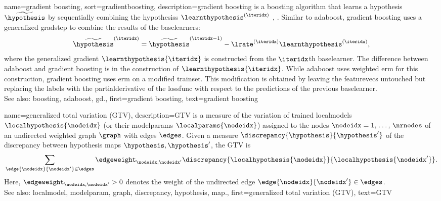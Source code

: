 {name={gradient boosting},
sort={gradientboosting},
 	description={\Gls{gradient} \gls{boosting} is a \gls{boosting} 
 		\gls{algorithm} that learns a \gls{hypothesis} $\widetilde{\hypothesis}$ 
 		by sequentially combining the \glspl{hypothesis} $\learnthypothesis^{(\iteridx)}$ 
 		\cite[Algorithm 10.3]{hastie01statisticallearning}, \cite{Friedman2001}. 
 		Similar to \gls{adaboost}, \gls{gradient} \gls{boosting} uses a generalized \gls{gradstep} 
 		to combine the results of the \glspl{baselearner}:
        		$$\widetilde{\hypothesis}^{(\iteridx)} = \widetilde{\hypothesis}^{(\iteridx-1)}-\lrate^{(\iteridx)} 
 		\learnthypothesis^{(\iteridx)},$$
 		where the generalized \gls{gradient} $\learnthypothesis{\iteridx}$ is constructed from 
		the $\iteridx$th \gls{baselearner}.
 		The difference between \gls{adaboost} and \gls{gradient} \gls{boosting} is in the construction 
		of $\learnthypothesis{\iteridx}$. While \gls{adaboost} uses weighted \gls{erm} for this construction, 
		\gls{gradient} \gls{boosting} uses \gls{erm} on a modified \gls{trainset}. This modification is obtained 
		by leaving the \glspl{featurevec} untouched but replacing the \glspl{label} with the 
		\gls{partialderivative} of the \gls{lossfunc} with respect to the \glspl{prediction} 
		of the previous \gls{baselearner}.   
 		 \\
 		See also: \gls{boosting}, \gls{adaboost}, \gls{gd}.},
 	first={gradient boosting}, 
 	text={gradient boosting}
}
	
{name={generalized total variation (GTV)}, 
	description={GTV is a 
		\gls{measure} of the variation of trained \glspl{localmodel} $\localhypothesis{\nodeidx}$ 
		(or their \glspl{modelparam} $\localparams{\nodeidx}$) assigned to the nodes $\nodeidx=1, \,\ldots, \,\nrnodes$ 
		of an undirected weighted \gls{graph} $\graph$ with edges $\edges$. Given a \gls{measure} $\discrepancy{\hypothesis}{\hypothesis'}$ 
		of the \gls{discrepancy} between \gls{hypothesis} \glspl{map} $\hypothesis,\hypothesis'$, the GTV is 
		\begin{equation} 
			\nonumber
			\sum_{\edge{\nodeidx}{\nodeidx'}\in \edges} \edgeweight_{\nodeidx,\nodeidx'} 
			\discrepancy{\localhypothesis{\nodeidx}}{\localhypothesis{\nodeidx'}}.
		\end{equation}
		Here, $\edgeweight_{\nodeidx,\nodeidx'}>0$ denotes the weight of the undirected edge $\edge{\nodeidx}{\nodeidx'}\in \edges$.
				\\
		See also: \gls{localmodel}, \gls{modelparam}, \gls{graph}, \gls{discrepancy}, \gls{hypothesis}, \gls{map}.},
	first={generalized total variation (GTV)},
	text={GTV} 
}
	
